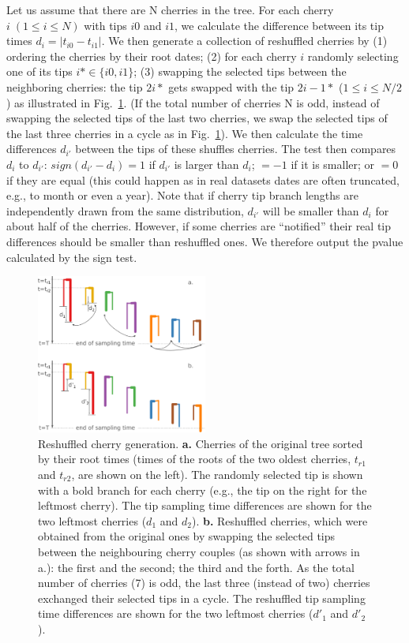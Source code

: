 \documentclass[10pt,letterpaper]{article}
\begin{document}
Let us assume that there are N cherries in the tree. For each cherry $i\;(1 \leq i \leq N)$ with tips $i0$ and $i1$, we calculate the difference between its tip times $d_i = |t_{i0} - t_{i1}|$. We then generate a collection of reshuffled cherries by (1) ordering the cherries by their root dates; (2) for each cherry $i$ randomly selecting one of its tips $i* \in \{i0, i1\}$; (3) swapping the selected tips between the neighboring cherries: the tip $2i*$ gets swapped with the tip $2i-1*$ ($1 \leq i \leq N / 2$) as illustrated in Fig.~\ref{fig:tipswap}. (If the total number of cherries N is odd, instead of swapping the selected tips of the last two cherries, we swap the selected tips of the last three cherries in a cycle as in Fig.~\ref{fig:tipswap}). We then calculate the time differences $d_{i'}$ between the tips of these shuffles cherries. 
The test then compares $d_i$ to $d_{i'}$: $sign(d_{i'} - d_i) = 1$ if $d_{i'}$ is larger than $d_i$; $= -1$ if it is smaller; or $= 0$ if they are equal (this could happen as in real datasets dates are often truncated, e.g., to month or even a year). Note that if cherry tip branch lengths are independently drawn from the same distribution, $d_{i'}$ will be smaller than $d_i$ for about half of the cherries. However, if some cherries are ``notified'' their real tip differences should be smaller than reshuffled ones. We therefore output the pvalue calculated by the sign test.


\begin{figure}[tbhp]
\centering 
\includegraphics[width=0.5\textwidth]{Fig_cherryswap.png}
\caption{Reshuffled cherry generation. \textbf{a.} Cherries of the original tree sorted by their root times (times of the roots of the two oldest cherries, $t_{r1}$ and $t_{r2}$, are shown on the left). The randomly selected tip is shown with a bold branch for each cherry (e.g., the tip on the right for the leftmost cherry). The tip sampling time differences are shown for the two leftmost cherries ($d_1$ and $d_2$). \textbf{b.} Reshuffled cherries, which were obtained from the original ones by swapping the selected tips between the neighbouring cherry couples (as shown with arrows in a.): the first and the second; the third and the forth. As the total number of cherries (7) is odd, the last three (instead of two) cherries exchanged their selected tips in a cycle. The reshuffled tip sampling time differences are shown for the two leftmost cherries ($d'_1$ and $d'_2$).}
\label{fig:tipswap} 
\end{figure}
\end{document}
